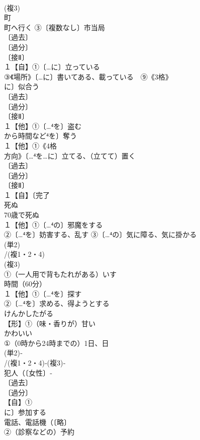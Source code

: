 \documentclass[8pt]{extreport}
\begin{document}
\begin{CJK}{UTF8}{min}
\\	(複3)
\\	町 
\\	町へ行く ③〔複数なし〕市当局
\\	〔過去〕
\\	〔過分〕
\\	〔接Ⅱ〕
\\	１【自】①〔…に〕立っている
\\	③《場所》〔…に〕書いてある、載っている　⑨《3格》
\\	に〕似合う
\\	〔過去〕
\\	〔過分〕
\\	〔接Ⅱ〕
\\	１【他】①〔…⁴を〕盗む 
\\	から時間など⁴を〕奪う
\\	１【他】①《4格
\\	方向》〔…⁴を…に〕立てる、（立てて）置く
\\	〔過去〕
\\	〔過分〕
\\	〔接Ⅱ〕
\\	１【自】〔完了
\\	死ぬ 
\\	70歳で死ぬ
\\	１【他】①〔…⁴の〕邪魔をする
\\	②〔…⁴を〕妨害する、乱す ③〔…⁴の〕気に障る、気に掛かる
\\	(単2)
\\	/(複1・2・4)
\\	(複3)
\\	①（一人用で背もたれがある）いす
\\	時間（60分）
\\	１【他】①〔…⁴を〕探す
\\	②〔…⁴を〕求める、得ようとする　
\\	けんかしたがる
\\	【形】①（味・香りが）甘い　
\\	かわいい
\\	①（0時から24時までの）1日、日
\\	(単2)‐
\\	/(複1・2・4)‐(複3)‐
\\	犯人（〔女性〕‐
\\	〔過去〕
\\	〔過分〕
\\	【自】①
\\	に〕参加する
\\	電話、電話機（〔略〕
\\	②（診察などの）予約 

\end{CJK}
\end{document}
